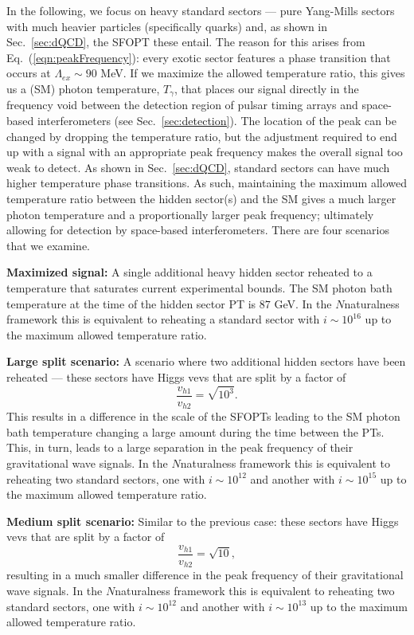 \documentclass[nofootinbib,twocolumn,preprintnumbers]{revtex4-1}
\begin{document}
In the following, we focus on heavy standard sectors --- pure Yang-Mills sectors with much heavier particles (specifically quarks) and, as shown in Sec.~\ref{sec:dQCD}, the SFOPT these entail. The reason for this arises from Eq.~(\ref{eqn:peakFrequency}): every exotic sector features a phase transition that occurs at $\Lambda_{ex} \sim 90$ MeV. If we maximize the allowed temperature ratio, this gives us a (SM) photon temperature, $T_{\gamma}$, that places our signal directly in the frequency void between the detection region of pulsar timing arrays and space-based interferometers (see Sec.~\ref{sec:detection}). The location of the peak can be changed by dropping the temperature ratio, but the adjustment required to end up with a signal with an appropriate peak frequency makes the overall signal too weak to detect. As shown in Sec.~\ref{sec:dQCD}, standard sectors can have much higher temperature phase transitions. As such, maintaining the maximum allowed temperature ratio between the hidden sector(s) and the SM gives a much larger photon temperature and a proportionally larger peak frequency; ultimately allowing for detection by space-based interferometers. There are four scenarios that we examine.

\textbf{Maximized signal:} A single additional heavy hidden sector reheated to a temperature that saturates current experimental bounds. The SM photon bath temperature at the time of the hidden sector PT is $87$ GeV. In the $N$naturalness framework this is equivalent to reheating a standard sector with $i\sim 10^{16}$ up to the maximum allowed temperature ratio.

\textbf{Large split scenario:} A scenario where two additional hidden sectors have been reheated --- these sectors have Higgs vevs that are split by a factor of 
\begin{equation}
 \frac{v_{h1}}{v_{h2}} = \sqrt{10^3}.
\end{equation}
This results in a difference in the scale of the SFOPTs leading to the SM photon bath temperature changing a large amount during the time between the PTs. This, in turn, leads to a large separation in the peak frequency of their gravitational wave signals.  In the $N$naturalness framework this is equivalent to reheating two standard sectors, one with $i\sim 10^{12}$ and another with $i\sim 10^{15}$ up to the maximum allowed temperature ratio.

\textbf{Medium split scenario:} Similar to the previous case: these sectors have Higgs vevs that are split by a factor of 
 \begin{equation}
 \frac{v_{h1}}{v_{h2}} = \sqrt{10},
\end{equation}
resulting in a much smaller difference in the peak frequency of their gravitational wave signals. In the $N$naturalness framework this is equivalent to reheating two standard sectors, one with $i\sim 10^{12}$ and another with $i\sim 10^{13}$ up to the maximum allowed temperature ratio.
\end{document}
